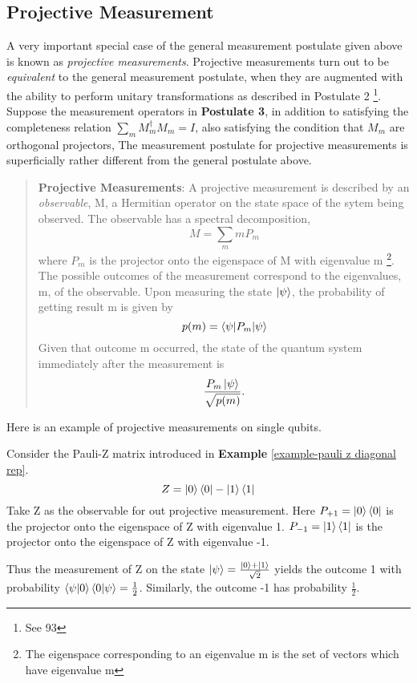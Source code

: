 \subsection{Projective Measurement}
A very important special case of the general measurement postulate given above is known as \textit{projective measurements}. Projective measurements turn out to be \textit{equivalent} to the general measurement postulate, when they are augmented with the ability to perform unitary transformations as described in Postulate 2 \footnote{See \cite{Wehner:notes} 93}. 
Suppose the measurement operators in \textbf{Postulate 3}, in addition to satisfying the completeness relation  $\sum_m M_m^\dagger M_m =I$, also satisfying the condition that $M_m$ are orthogonal projectors, 
The measurement postulate for projective measurements is superficially rather different from the general postulate above.
\begin{quote}
    \textbf{Projective Measurements}: A projective measurement is described by an \textit{observable}, M, a Hermitian operator on the state space of the sytem being observed. The observable has a spectral decomposition,
    \begin{equation}
        M=\sum_m m P_m
    \end{equation}
    where $P_m$ is the projector onto the eigenspace of M with eigenvalue m \footnote{The eigenspace corresponding to an eigenvalue m is the set of vectors which have eigenvalue m}. The possible outcomes of the measurement correspond to the eigenvalues, m, of the observable. Upon measuring the state $\ket{\psi}$, the probability of getting result m is given by 
    \begin{equation}
        p(m)=\braket{\psi|P_m|\psi}
    \end{equation}
    Given that outcome m occurred, the state of the quantum system immediately after the measurement is 
    \begin{equation}
        \frac{P_m \ket{\psi}}{\sqrt{p(m)}}.
    \end{equation}
\end{quote}

Here is an example of projective measurements on single qubits.
\begin{example}
Consider the Pauli-Z matrix introduced in \textbf{Example} \ref{example-pauli z diagonal rep}.
\begin{equation}
    Z=\ket{0}\bra{0}-\ket{1}\bra{1}
\end{equation}
Take Z as the observable for out projective measurement. Here $P_{+1}=\ket{0}\bra{0}$ is the projector onto the eigenspace of Z with eigenvalue 1. $P_{-1}=\ket{1}\bra{1}$ is the projector onto the eigenspace of Z with eigenvalue -1.

Thus the measurement of Z on the state $\ket{\psi}=\frac{\ket{0}+\ket{1}}{\sqrt{2}}$ yields the outcome 1 with probability $\braket{\psi|0}\braket{0|\psi}=\frac{1}{2}$. Similarly, the outcome -1 has probability $\frac{1}{2}$.
\end{example}

